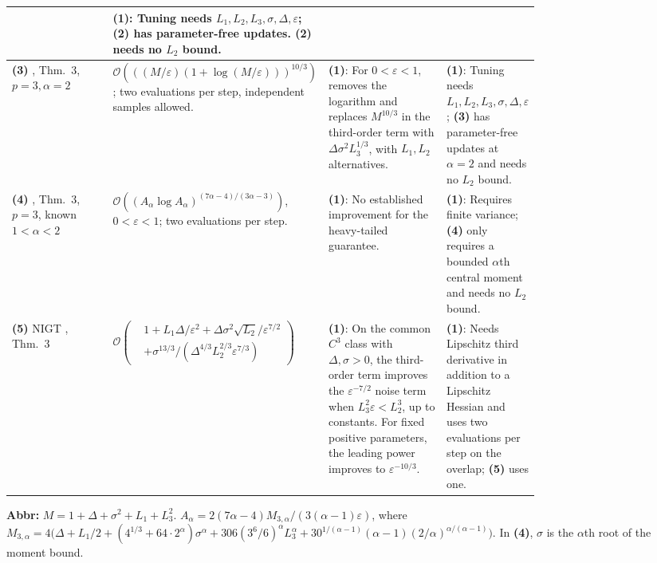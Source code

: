 \begin{table}[tp]
\begin{threeparttable}
\begin{tabularx}{\linewidth}{@{}>{\raggedright\arraybackslash}p{0.21\linewidth}>{\raggedright\arraybackslash}p{0.31\linewidth}>{\raggedright\arraybackslash}p{0.25\linewidth}>{\raggedright\arraybackslash}X@{}}
& \textbf{(1)}: Tuning needs $L_1,L_2,L_3,\sigma,\Delta,\varepsilon$; \textbf{(2)} has parameter-free updates. \textbf{(2)} needs no $L_2$ bound. \\
\midrule
\textbf{(3)} \citep{stosHeLuSunDeng2026v2}, Thm.~3, $p=3,\alpha=2$
& $\mathcal{O}(((M/\varepsilon)(1+\log(M/\varepsilon)))^{10/3})$; two evaluations per step, independent samples allowed.
& \textbf{(1)}: For $0<\varepsilon<1$, removes the logarithm and replaces $M^{10/3}$ in the third-order term with $\Delta\sigma^2 L_3^{1/3}$, with $L_1,L_2$ alternatives.
& \textbf{(1)}: Tuning needs $L_1,L_2,L_3,\sigma,\Delta,\varepsilon$; \textbf{(3)} has parameter-free updates at $\alpha=2$ and needs no $L_2$ bound. \\
\midrule
\textbf{(4)} \citep{stosHeLuSunDeng2026v2}, Thm.~3, $p=3$, known $1<\alpha<2$
& $\mathcal{O}((A_\alpha\log A_\alpha)^{(7\alpha-4)/(3\alpha-3)})$, $0<\varepsilon<1$; two evaluations per step.
& \textbf{(1)}: No established improvement for the heavy-tailed guarantee.
& \textbf{(1)}: Requires finite variance; \textbf{(4)} only requires a bounded $\alpha$th central moment and needs no $L_2$ bound. \\
\midrule
\textbf{(5)} NIGT \citep{shncscCutkosky2020}, Thm.~3
& $\mathcal{O}\!\left(\begin{aligned}
 &1+L_1\Delta/\varepsilon^2+\Delta\sigma^2\sqrt{L_2}/\varepsilon^{7/2}\\[-1pt]
 &+\sigma^{13/3}/(\Delta^{4/3}L_2^{2/3}\varepsilon^{7/3})
\end{aligned}\right)$
& \textbf{(1)}: On the common $C^3$ class with $\Delta,\sigma>0$, the third-order term improves the $\varepsilon^{-7/2}$ noise term when $L_3^2\varepsilon<L_2^3$, up to constants. For fixed positive parameters, the leading power improves to $\varepsilon^{-10/3}$.
& \textbf{(1)}: Needs Lipschitz third derivative in addition to a Lipschitz Hessian and uses two evaluations per step on the overlap; \textbf{(5)} uses one. \\
\bottomrule
\end{tabularx}
\begin{tablenotes}[flushleft]\footnotesize
\item[] \textbf{Abbr:} $M=1+\Delta+\sigma^2+L_1+L_3^2$.
$A_\alpha=2(7\alpha-4)M_{3,\alpha}/(3(\alpha-1)\varepsilon)$, where
$M_{3,\alpha}=4\bigl(\Delta+L_1/2+(4^{1/3}+64\cdot 2^\alpha)\sigma^\alpha
+306(3^6/6)^\alpha L_3^\alpha
+30^{1/(\alpha-1)}(\alpha-1)(2/\alpha)^{\alpha/(\alpha-1)}\bigr)$.
In \textbf{(4)}, $\sigma$ is the $\alpha$th root of the moment bound.
\end{tablenotes}
\end{threeparttable}
\end{table}
